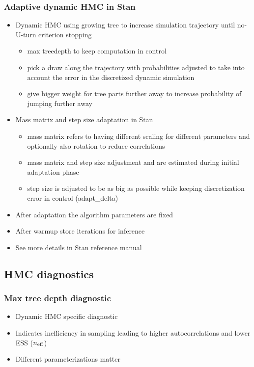 \documentclass[10pt]{beamer}
\begin{document}
\begin{frame}

\frametitle{Adaptive dynamic HMC in Stan}

  \begin{itemize}
  \item Dynamic HMC using growing tree to increase simulation
    trajectory until no-U-turn criterion stopping %
    \begin{itemize}
    \item max treedepth to keep computation in control
    \item<2-> pick a draw along the trajectory with probabilities adjusted
      to take into account the error in the discretized dynamic
      simulation
    \item<3-> give bigger weight for tree parts further away to increase
      probability of jumping further away
    \end{itemize}
  \item<4-> Mass matrix and step size adaptation in Stan
    \begin{itemize}
    \item<4-> mass matrix refers to having different scaling for different
      parameters and optionally also rotation to reduce correlations
    \item<5-> mass matrix and step size adjustment and are estimated
      during initial adaptation phase
    \item<6-> step size is adjusted to be as big as possible while keeping
      discretization error in control (adapt\_delta)
    \end{itemize}
  \item<7-> After adaptation the algorithm parameters are fixed
  \item<8-> After warmup store iterations for inference
  \item<9-> See more details in Stan reference manual
\end{itemize}

\end{frame}

\subsection{HMC diagnostics}
\frame{\sectionpage}

\begin{frame}

\frametitle{Max tree depth diagnostic}

  \begin{itemize}
  \item Dynamic HMC specific diagnostic
  \item Indicates inefficiency in sampling leading to higher
    autocorrelations and lower ESS ($n_{\rm eff}$)
  \item Different parameterizations matter
  \end{itemize}
\end{frame}
\end{document}
